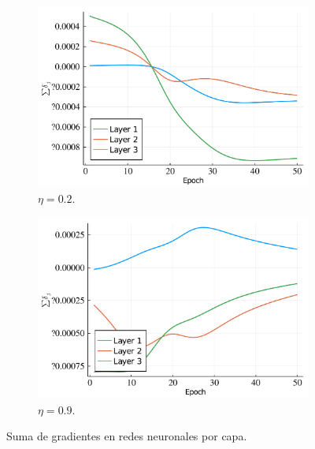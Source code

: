 \documentclass[fleqn]{article}
\begin{document}
\begin{enumerate}
    \begin{figure}[H]
    \centering
    \begin{subfigure}[b]{0.45\textwidth}
        \centering
        \includegraphics[width=\textwidth]{2/grads.pdf}
        \caption{$\eta=0.2$.}
    \end{subfigure}
    \begin{subfigure}[b]{0.45\textwidth}  
        \centering 
        \includegraphics[width=\textwidth]{9/grads.pdf}
        \caption{$\eta=0.9$.}
    \end{subfigure}
    \caption{Suma de gradientes en redes neuronales por capa.}
    \label{fig:grads}
    \end{figure}
    

\end{enumerate}
\end{document}
